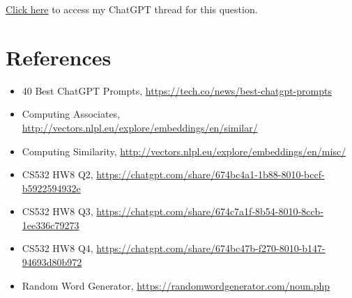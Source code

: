 \documentclass[12pt]{article}
\begin{document}
\href{https://chatgpt.com/share/674bc47b-f270-8010-b147-94693d80b972}{Click here} to access my ChatGPT thread for this question.


\section*{References}

\begin{itemize}
    \item {40 Best ChatGPT Prompts, \url{https://tech.co/news/best-chatgpt-prompts}}
    \item {Computing Associates, \url{http://vectors.nlpl.eu/explore/embeddings/en/similar/}}
    \item {Computing Similarity, \url{http://vectors.nlpl.eu/explore/embeddings/en/misc/}}
    \item {CS532 HW8 Q2, \url{https://chatgpt.com/share/674bc4a1-1b88-8010-bccf-b5922594932e}}
    \item {CS532 HW8 Q3, \url{https://chatgpt.com/share/674c7a1f-8b54-8010-8ccb-1ee336c79273}}
    \item {CS532 HW8 Q4, \url{https://chatgpt.com/share/674bc47b-f270-8010-b147-94693d80b972}}
    \item {Random Word Generator, \url{https://randomwordgenerator.com/noun.php}}
\end{itemize}
\end{document}
